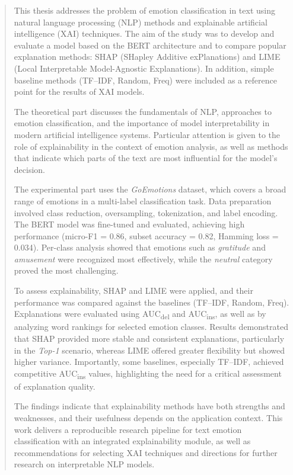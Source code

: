 \documentclass[wmii, inf, mgr]{uwmthesis}
\begin{document}
\begin{abstract}
This thesis addresses the problem of emotion classification in text using natural language processing (NLP) methods and explainable artificial intelligence (XAI) techniques. The aim of the study was to develop and evaluate a model based on the BERT architecture and to compare popular explanation methods: SHAP (SHapley Additive exPlanations) and LIME (Local Interpretable Model-Agnostic Explanations). In addition, simple baseline methods (TF--IDF, Random, Freq) were included as a reference point for the results of XAI models. 

The theoretical part discusses the fundamentals of NLP, approaches to emotion classification, and the importance of model interpretability in modern artificial intelligence systems. Particular attention is given to the role of explainability in the context of emotion analysis, as well as methods that indicate which parts of the text are most influential for the model’s decision. 

The experimental part uses the \emph{GoEmotions} dataset, which covers a broad range of emotions in a multi-label classification task. Data preparation involved class reduction, oversampling, tokenization, and label encoding. The BERT model was fine-tuned and evaluated, achieving high performance (micro-F1 = 0.86, subset accuracy = 0.82, Hamming loss = 0.034). Per-class analysis showed that emotions such as \emph{gratitude} and \emph{amusement} were recognized most effectively, while the \emph{neutral} category proved the most challenging. 

To assess explainability, SHAP and LIME were applied, and their performance was compared against the baselines (TF--IDF, Random, Freq). Explanations were evaluated using AUC\textsubscript{del} and AUC\textsubscript{ins}, as well as by analyzing word rankings for selected emotion classes. Results demonstrated that SHAP provided more stable and consistent explanations, particularly in the \emph{Top-1} scenario, whereas LIME offered greater flexibility but showed higher variance. Importantly, some baselines, especially TF--IDF, achieved competitive AUC\textsubscript{ins} values, highlighting the need for a critical assessment of explanation quality. 

The findings indicate that explainability methods have both strengths and weaknesses, and their usefulness depends on the application context. This work delivers a reproducible research pipeline for text emotion classification with an integrated explainability module, as well as recommendations for selecting XAI techniques and directions for further research on interpretable NLP models.

\end{abstract}
\end{document}
